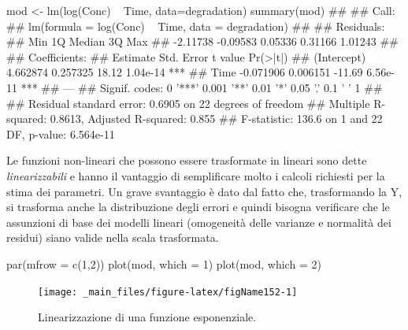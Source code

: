 \documentclass[a4paper,12pt,oneside]{book}
\newenvironment{Shaded}{}{}
\newcommand{\KeywordTok}[1]{#1}
\newcommand{\DataTypeTok}[1]{#1}
\newcommand{\DecValTok}[1]{#1}
\newcommand{\StringTok}[1]{#1}
\newcommand{\CommentTok}[1]{#1}
\newcommand{\OperatorTok}[1]{#1}
\newcommand{\NormalTok}[1]{#1}
\begin{document}
\begin{Shaded}
\begin{Highlighting}[]
\NormalTok{mod <-}\StringTok{ }\KeywordTok{lm}\NormalTok{(}\KeywordTok{log}\NormalTok{(Conc) }\OperatorTok{~}\StringTok{ }\NormalTok{Time, }\DataTypeTok{data=}\NormalTok{degradation)}
\KeywordTok{summary}\NormalTok{(mod)}
\CommentTok{## }
\CommentTok{## Call:}
\CommentTok{## lm(formula = log(Conc) ~ Time, data = degradation)}
\CommentTok{## }
\CommentTok{## Residuals:}
\CommentTok{##      Min       1Q   Median       3Q      Max }
\CommentTok{## -2.11738 -0.09583  0.05336  0.31166  1.01243 }
\CommentTok{## }
\CommentTok{## Coefficients:}
\CommentTok{##              Estimate Std. Error t value Pr(>|t|)    }
\CommentTok{## (Intercept)  4.662874   0.257325   18.12 1.04e-14 ***}
\CommentTok{## Time        -0.071906   0.006151  -11.69 6.56e-11 ***}
\CommentTok{## ---}
\CommentTok{## Signif. codes:  0 '***' 0.001 '**' 0.01 '*' 0.05 '.' 0.1 ' ' 1}
\CommentTok{## }
\CommentTok{## Residual standard error: 0.6905 on 22 degrees of freedom}
\CommentTok{## Multiple R-squared:  0.8613, Adjusted R-squared:  0.855 }
\CommentTok{## F-statistic: 136.6 on 1 and 22 DF,  p-value: 6.564e-11}
\end{Highlighting}
\end{Shaded}

Le funzioni non-lineari che possono essere trasformate in lineari sono dette \emph{linearizzabili} e hanno il vantaggio di semplificare molto i calcoli richiesti per la stima dei parametri. Un grave svantaggio è dato dal fatto che, trasformando la Y, si trasforma anche la distribuzione degli errori e quindi bisogna verificare che le assunzioni di base dei modelli lineari (omogeneità delle varianze e normalità dei residui) siano valide nella scala trasformata.

\begin{Shaded}
\begin{Highlighting}[]
\KeywordTok{par}\NormalTok{(}\DataTypeTok{mfrow =} \KeywordTok{c}\NormalTok{(}\DecValTok{1}\NormalTok{,}\DecValTok{2}\NormalTok{))}
\KeywordTok{plot}\NormalTok{(mod, }\DataTypeTok{which =} \DecValTok{1}\NormalTok{)}
\KeywordTok{plot}\NormalTok{(mod, }\DataTypeTok{which =} \DecValTok{2}\NormalTok{)}
\end{Highlighting}
\end{Shaded}

\begin{figure}

{\centering \texttt{[image: \_main\_files/figure-latex/figName152-1]} 

}

\caption{Linearizzazione di una funzione esponenziale.}\label{fig:figName152}
\end{figure}
\end{document}
